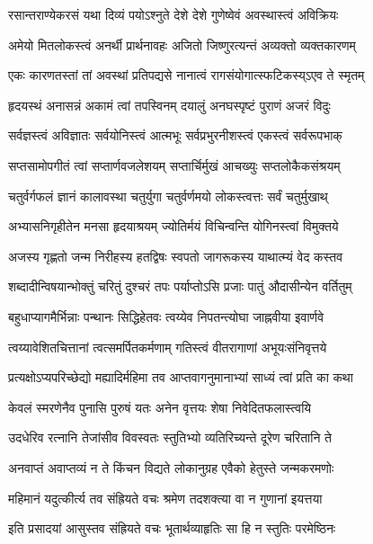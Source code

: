 \twolineshloka
{रसान्तराण्येकरसं यथा दिव्यं पयोऽश्नुते}
{देशे देशे गुणेष्वेवं अवस्थास्त्वं अविक्रियः}%

\twolineshloka
{अमेयो मितलोकस्त्वं अनर्थी प्रार्थनावहः}
{अजितो जिष्णुरत्यन्तं अव्यक्तो व्यक्तकारणम्}%

\twolineshloka
{एकः कारणतस्तां तां अवस्थां प्रतिपद्यसे}
{नानात्वं रागसंयोगात्स्फटिकस्य्ऽएव ते स्मृतम्}%

\twolineshloka
{हृदयस्थं अनासन्नं अकामं त्वां तपस्विनम्}
{दयालुं अनघस्पृष्टं पुराणं अजरं विदुः}%

\twolineshloka
{सर्वज्ञस्त्वं अविज्ञातः सर्वयोनिस्त्वं आत्मभूः}
{सर्वप्रभुरनीशस्त्वं एकस्त्वं सर्वरूपभाक्}%

\twolineshloka
{सप्तसामोपगीतं त्वां सप्तार्णवजलेशयम्}
{सप्तार्चिर्मुखं आचख्युः सप्तलोकैकसंश्रयम्}%

\twolineshloka
{चतुर्वर्गफलं ज्ञानं कालावस्था चतुर्युगा}
{चतुर्वर्णमयो लोकस्त्वत्तः सर्वं चतुर्मुखाथ्}%

\twolineshloka
{अभ्यासनिगृहीतेन मनसा हृदयाश्रयम्}
{ज्योतिर्मयं विचिन्वन्ति योगिनस्त्वां विमुक्तये}%

\twolineshloka
{अजस्य गृह्णतो जन्म निरीहस्य हतद्विषः}
{स्वपतो जागरूकस्य याथात्म्यं वेद कस्तव}%

\twolineshloka
{शब्दादीन्विषयान्भोक्तुं चरितुं दुश्चरं तपः}
{पर्याप्तोऽसि प्रजाः पातुं औदासीन्येन वर्तितुम्}%

\twolineshloka
{बहुधाप्यागमैर्भिन्नाः पन्थानः सिद्धिहेतवः}
{त्वय्येव निपतन्त्योघा जाह्नवीया इवार्णवे}%

\twolineshloka
{त्वय्यावेशितचित्तानां त्वत्समर्पितकर्मणाम्}
{गतिस्त्वं वीतरागाणां अभूयःसंनिवृत्तये}%

\twolineshloka
{प्रत्यक्षोऽप्यपरिच्छेद्यो मह्यादिर्महिमा तव}
{आप्तवागनुमानाभ्यां साध्यं त्वां प्रति का कथा}%

\twolineshloka
{केवलं स्मरणेनैव पुनासि पुरुषं यतः}
{अनेन वृत्तयः शेषा निवेदितफलास्त्वयि}%

\twolineshloka
{उदधेरिव रत्नानि तेजांसीव विवस्वतः}
{स्तुतिभ्यो व्यतिरिच्यन्ते दूरेण चरितानि ते}%

\twolineshloka
{अनवाप्तं अवाप्तव्यं न ते किंचन विद्यते}
{लोकानुग्रह एवैको हेतुस्ते जन्मकरमणोः}%

\twolineshloka
{महिमानं यदुत्कीर्त्य तव संह्रियते वचः}
{श्रमेण तदशक्त्या वा न गुणानां इयत्तया}%

\twolineshloka
{इति प्रसादयां आसुस्तव संह्रियते वचः}
{भूतार्थव्याहृतिः सा हि न स्तुतिः परमेष्ठिनः}%


